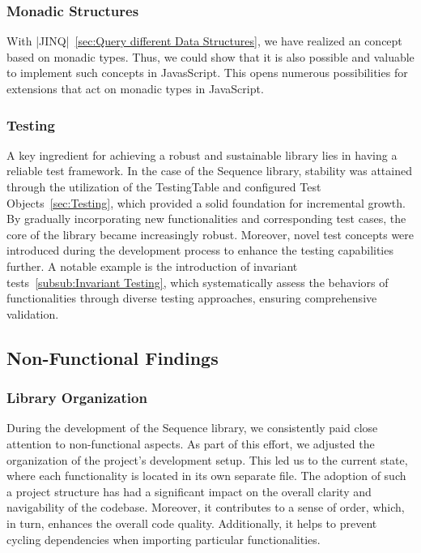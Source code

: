 \subsubsection{Monadic Structures}
\label{subsub:Monadic Structures}
With |JINQ|~\ref{sec:Query different Data Structures}, we have realized an
concept based on monadic types. Thus, we could show that it is also
possible and valuable to implement such concepts in JavasScript.
This opens numerous possibilities for extensions that act on monadic types in
JavaScript.

\subsubsection{Testing}
\label{subsub:Testing}
A key ingredient for achieving a robust and sustainable library lies in having
a reliable test framework. In the case of the Sequence library, stability was
attained through the utilization of the TestingTable and configured Test
Objects~\ref{sec:Testing}, which provided a solid foundation for incremental growth.
By gradually incorporating new functionalities and corresponding test cases,
the core of the library became increasingly robust. Moreover, novel test
concepts were introduced during the development process to enhance the testing
capabilities further. A notable example is the introduction of invariant tests~\ref{subsub:Invariant Testing},
which systematically assess the behaviors of functionalities through
diverse testing approaches, ensuring comprehensive validation.

\subsection{Non-Functional Findings}
\label{sub:Non-Functional Aspects}

\subsubsection{Library Organization}
\label{subsub:Library Organisation}
During the development of the Sequence library, we consistently paid close
attention to non-functional aspects. As part of this effort, we adjusted the
organization of the project's development setup. This led us to the current
state, where each functionality is located in its own separate file. The
adoption of such a project structure has had a significant impact on the
overall clarity and navigability of the codebase. Moreover, it contributes to a
sense of order, which, in turn, enhances the overall code quality.
Additionally, it helps to prevent cycling dependencies when importing
particular functionalities.

